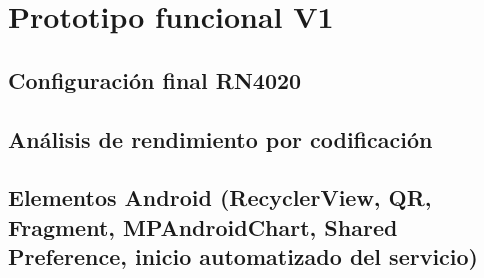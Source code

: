 \chapter{Prototipo funcional V1}\label{proto1}



\section{Configuración final RN4020}



\section{Análisis de rendimiento por codificación }



\section{Elementos Android (RecyclerView, QR, Fragment, MPAndroidChart, Shared Preference, inicio automatizado del servicio) }

